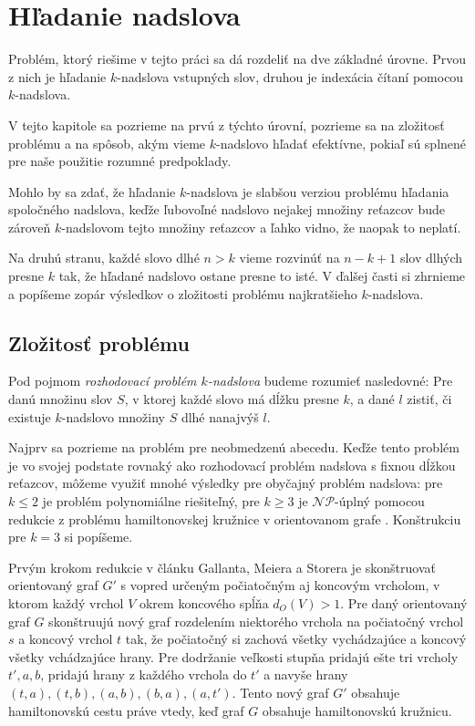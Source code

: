 \chapter{Hľadanie nadslova}

Problém, ktorý riešime v tejto práci sa dá rozdeliť na dve základné úrovne.
Prvou z nich je hľadanie $k$-nadslova vstupných slov, druhou je indexácia
čítaní pomocou $k$-nadslova.

V tejto kapitole sa pozrieme na prvú z týchto úrovní, pozrieme sa na zložitosť problému
a na spôsob, akým vieme $k$-nadslovo hľadať efektívne, pokiaľ sú splnené pre naše
použitie rozumné predpoklady.

Mohlo by sa zdať, že hľadanie $k$-nadslova je slabšou verziou problému hľadania
spoločného nadslova, keďže ľubovoľné nadslovo nejakej množiny reťazcov bude zároveň
$k$-nadslovom tejto množiny reťazcov a ľahko vidno, že naopak to neplatí.

Na druhú stranu, každé slovo dlhé $n > k$ vieme rozvinúť na $n - k + 1$ slov dlhých
presne $k$ tak, že hľadané nadslovo ostane presne to isté. V ďalšej časti si zhrnieme
a popíšeme zopár výsledkov o zložitosti problému najkratšieho $k$-nadslova.


\section{Zložitosť problému}

\begin{defn}
Pod pojmom \emph{rozhodovací problém $k$-nadslova} budeme rozumieť nasledovné:
Pre danú množinu slov $S$, v ktorej každé slovo má dĺžku presne $k$,
a dané $l$ zistiť, či existuje $k$-nadslovo množiny $S$ dlhé nanajvýš $l$.
\end{defn}

Najprv sa pozrieme na problém pre neobmedzenú abecedu. Keďže tento problém je
vo svojej podstate rovnaký ako rozhodovací problém nadslova s fixnou dĺžkou reťazcov, môžeme využiť mnohé výsledky
pre obyčajný problém nadslova: pre $k \leq 2$ je problém polynomiálne riešiteľný,
pre $k \ge 3$ je $\mathcal{NP}$-úplný pomocou redukcie z problému hamiltonovskej
kružnice v orientovanom grafe \cite{superstring}. Konštrukciu pre $k = 3$ si popíšeme.

Prvým krokom redukcie v článku Gallanta, Meiera a Storera je skonštruovať orientovaný
graf $G'$ s vopred určeným počiatočným aj koncovým vrcholom, v ktorom každý vrchol $V$
okrem koncového spĺňa $d_O(V) > 1$. Pre daný orientovaný graf $G$
skonštruujú nový graf rozdelením niektorého vrchola na počiatočný vrchol $s$ a
koncový vrchol $t$ tak, že počiatočný si zachová všetky vychádzajúce a koncový
všetky vchádzajúce hrany. Pre dodržanie veľkosti stupňa pridajú ešte tri vrcholy
$t', a, b$, pridajú hrany z každého vrchola do $t'$ a navyše hrany $(t, a), (t, b),
(a, b), (b, a), (a, t')$. Tento nový graf $G'$ obsahuje hamiltonovskú cestu práve vtedy,
keď graf $G$ obsahuje hamiltonovskú kružnicu.


